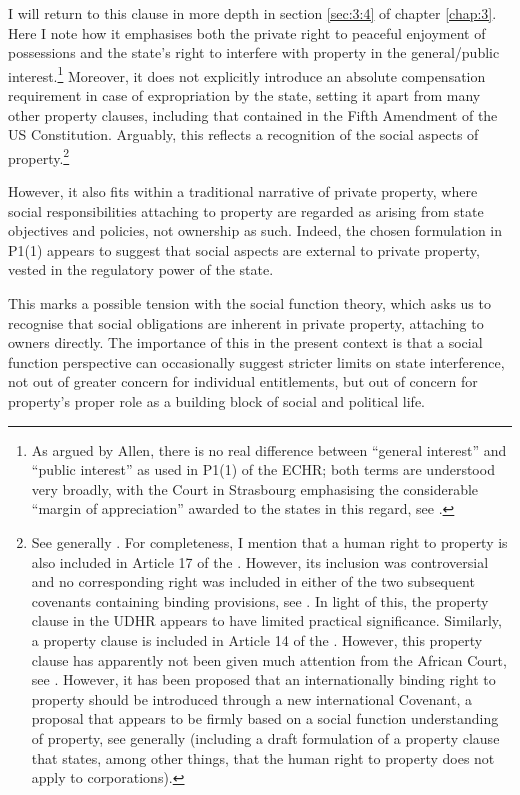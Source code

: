 I will return to this clause in more depth in section \ref{sec:3:4} of chapter \ref{chap:3}. Here I note how it emphasises both the private right to peaceful enjoyment of possessions and the state's right to interfere with property in the general/public interest.\footnote{As argued by Allen, there is no real difference between ``general interest'' and ``public interest'' as used in P1(1) of the ECHR; both terms are understood very broadly, with the Court in Strasbourg emphasising the considerable ``margin of appreciation'' awarded to the states in this regard, see \cite[29-30]{allen05}.} Moreover, it does not explicitly introduce an absolute compensation requirement in case of expropriation by the state, setting it apart from many other property clauses, including that contained in the Fifth Amendment of the US Constitution. Arguably, this reflects a recognition of the social aspects of property.\footnote{See generally \cite{allen10}. For completeness, I mention that a human right to property is also included in Article 17 of the \cite{udhr}. However, its inclusion was controversial and no corresponding right was included in either of the two subsequent covenants containing binding provisions, see \cite{fne,fnp}. In light of this, the property clause in the UDHR appears to have limited practical significance. Similarly, a property clause is included in Article 14 of the \cite{banjul}. However, this property clause has apparently not been given much attention from the African Court, see \cite[83]{walt11}. However, it has been proposed that an internationally binding right to property should be introduced through a new international Covenant, a proposal that appears to be firmly based on a social function understanding of property, see generally \cite{hassmann13} (including a draft formulation of a property clause that states, among other things, that the human right to property does not apply to corporations).}

However, it also fits within a traditional narrative of private property, where social responsibilities attaching to property are regarded as arising from state objectives and policies, not ownership as such. Indeed, the chosen formulation in P1(1) appears to suggest that social aspects are external to private property, vested in the regulatory power of the state.

This marks a possible tension with the social function theory, which asks us to recognise that social obligations are inherent in private property, attaching to owners directly. The importance of this in the present context is that a social function perspective can occasionally suggest stricter limits on state interference, not out of greater concern for individual entitlements, but out of concern for property's proper role as a building block of social and political life.

